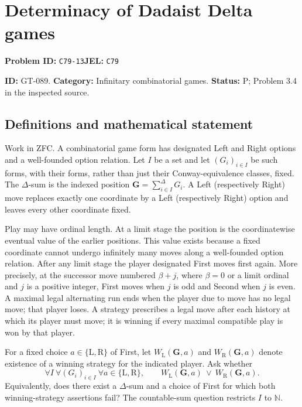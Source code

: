 \documentclass[11pt,a4paper]{article}
\begin{document}
\section*{Determinacy of Dadaist Delta games}
\textbf{Problem ID:} \texttt{C79-13}\quad \textbf{JEL:} \texttt{C79}\par
\label{problem:OP-0219}
\label{game:GT-089}
{\sffamily\small\color{muted}
\noindent\textbf{ID:} GT-089. \textbf{Category:} Infinitary combinatorial games.
\textbf{Status:} P; Problem 3.4 in the inspected source.
\par}
\subsection*{Definitions and mathematical statement}
Work in ZFC. A combinatorial game form has designated Left and Right options and a well-founded option relation. Let $I$ be a set and let $(G_i)_{i\in I}$ be such forms, with their forms, rather than just their Conway-equivalence classes, fixed. The $\Delta$-sum is the indexed position
$\mathbf G=\sum_{i\in I}^{\Delta}G_i$. A Left (respectively Right) move replaces exactly one coordinate by a Left (respectively Right) option and leaves every other coordinate fixed.

Play may have ordinal length. At a limit stage the position is the coordinatewise eventual value of the earlier positions. This value exists because a fixed coordinate cannot undergo infinitely many moves along a well-founded option relation. After any limit stage the player designated First moves first again. More precisely, at the successor move numbered $\beta+j$, where $\beta=0$ or a limit ordinal and $j$ is a positive integer, First moves when $j$ is odd and Second when $j$ is even. A maximal legal alternating run ends when the player due to move has no legal move; that player loses. A strategy prescribes a legal move after each history at which its player must move; it is winning if every maximal compatible play is won by that player.

For a fixed choice $a\in\{\mathrm L,\mathrm R\}$ of First, let
$W_{\mathrm L}(\mathbf G,a)$ and $W_{\mathrm R}(\mathbf G,a)$ denote existence of a winning strategy for the indicated player. Ask whether
\[
 \forall I\ \forall (G_i)_{i\in I}\ \forall a\in\{\mathrm L,\mathrm R\},
 \qquad W_{\mathrm L}(\mathbf G,a)\ \lor\ W_{\mathrm R}(\mathbf G,a).
\]
Equivalently, does there exist a $\Delta$-sum and a choice of First for which both winning-strategy assertions fail? The countable-sum question restricts $I$ to $\mathbb N$.
\end{document}
